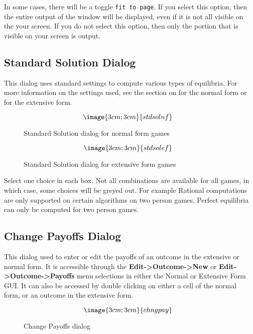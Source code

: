 In some cases, there will be a toggle \verb+fit to page+.  If you
select this option, then the entire output of the window will be
displayed, even if it is not all visible on the your screen.  If you
do not select this option, then only the portion that is visible on
your screen is output.

\subsection{Standard Solution Dialog}\label{StandardSolution}

This dialog uses standard settings to compute various types of
equilibria. For more information on the settings used, see the section
on  for the
normal form or 
for the extensive form.

\begin{figure}
$$\image{3cm;3cm}{stdsolnf}$$
\caption{Standard Solution dialog for normal form
games}\label{fig_standardsolnf}
\end{figure}

\begin{figure}
$$\image{3cm;3cm}{stdsolef}$$
\caption{Standard Solution dialog for extensive form
games}\label{fig_standardsolef}
\end{figure}

Select one choice in each box.  Not all combinations are available for
all games, in which case, some choices will be greyed out.  For
example Rational computations are only supported on certain algorithms
on two person games, Perfect equilibria can only be computed for two
person games.

\subsection{Change Payoffs Dialog}\label{ChangePayoff}

This dialog used to enter or edit the payoffs of an outcome in the
extensive or normal form. It is accessible through the {\bf 
Edit->Outcome->New} or {\bf Edit->Outcome->Payoffs} menu selections in
either the Normal or Extensive Form GUI. It can also be accessed by
double clicking on either a cell of the normal form, or an outcome in
the extensive form. 

\begin{figure}
$$\image{3cm;3cm}{chngpay}$$
\caption{Change Payoffs dialog}\label{fig_changepay}
\end{figure}


